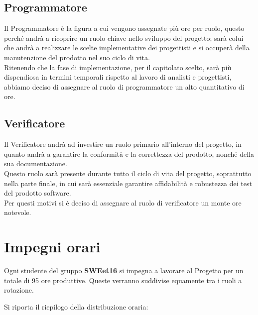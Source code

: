 \documentclass[a4paper, 11pt]{article}
\begin{document}
\subsection{Programmatore}
Il Programmatore è la figura a cui vengono assegnate più ore per ruolo, questo perché andrà a ricoprire un ruolo chiave nello sviluppo del progetto; sarà colui che andrà a realizzare le scelte implementative dei progettisti e si occuperà della manutenzione del prodotto nel suo ciclo di vita. \\
Ritenendo che la fase di implementazione, per il capitolato scelto, sarà più dispendiosa in termini temporali rispetto al lavoro di analisti e progettisti, abbiamo deciso di assegnare al ruolo di programmatore un alto quantitativo di ore.

\subsection{Verificatore}
Il Verificatore andrà ad investire un ruolo primario all'interno del progetto, in quanto andrà a garantire la conformità e la correttezza del prodotto, nonché della sua documentazione. \\
Questo ruolo sarà presente durante tutto il ciclo di vita del progetto, soprattutto nella parte finale, in cui sarà essenziale garantire affidabilità e robustezza dei test del prodotto software. \\
Per questi motivi si è deciso di assegnare al ruolo di verificatore un monte ore notevole.

\pagebreak
\section{Impegni orari}

Ogni studente del gruppo \textbf{SWEet16} si impegna a lavorare al Progetto per un totale di 95 ore produttive.
Queste verranno suddivise equamente tra i ruoli a rotazione.

Si riporta il riepilogo della distribuzione oraria:
\end{document}
